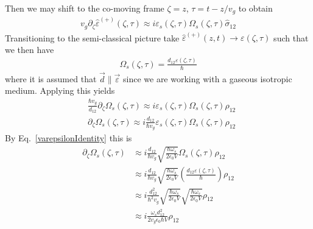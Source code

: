 \documentclass[aps,pra,showpacs,amsmath,amssymb,nofootinbib,longbibliography,superscriptaddress
]{revtex4-1}
\theoremstyle{definition}
\theoremstyle{remark}
\newcommand{\0}{\hat{0}}
\begin{document}
Then we may shift to the co-moving frame $\zeta= z$, $\tau = t - z / v_g$ to obtain
\begin{align}
    v_g \partial_\zeta \hat{\varepsilon}^{(+)}(\zeta, \tau)
    \approx
    i \varepsilon_s(\zeta, \tau) \Omega_{s}(\zeta, \tau) \hat{\sigma}_{12}
\end{align}
Transitioning to the semi-classical picture take $\hat{\varepsilon}^{(+)}(z,t) \rightarrow \varepsilon(\zeta, \tau)$ such that we then have
\begin{align}
    \Omega_s(\zeta, \tau) = \frac{d_{12} \varepsilon(\zeta, \tau)}{\hbar}
\end{align}
where it is assumed that $\vec{d} \parallel \vec{\varepsilon}$ since we are working with a gaseous isotropic medium. Applying this yields 
\begin{align}
    &\frac{\hbar v_g}{d_{12}} \partial_\zeta \Omega_s(\zeta, \tau)
    \approx
    i \varepsilon_s(\zeta, \tau) \Omega_{s}(\zeta, \tau) \rho_{12} \nonumber \\
    &\partial_\zeta \Omega_s(\zeta, \tau)
    \approx
    i \frac{d_{12}}{\hbar v_g}  \varepsilon_s(\zeta, \tau) \Omega_{s}(\zeta, \tau) \rho_{12} 
\end{align}
By Eq.~\eqref{varepsilonIdentity} this is
\begin{align}
    \partial_\zeta \Omega_s(\zeta, \tau)
    &\approx
    i \frac{d_{12}}{\hbar v_g}  \sqrt{\frac{\hbar \omega_s}{2 \epsilon_0 V}} \Omega_{s}(\zeta, \tau) \rho_{12} \nonumber \\
    &\approx
    i \frac{d_{12}}{\hbar v_g}  \sqrt{\frac{\hbar \omega_s}{2 \epsilon_0 V}} \left(\frac{d_{12} \varepsilon(\zeta, \tau)}{\hbar}\right) \rho_{12} \nonumber\\
    &\approx
    i \frac{d_{12}^2}{\hbar^2 v_g}  \sqrt{\frac{\hbar \omega_s}{2 \epsilon_0 V}} \sqrt{\frac{\hbar \omega_s}{2 \epsilon_0 V}} \rho_{12} \nonumber\\
    &\approx
    i \frac{\omega_s d_{12}^2}{2 v_g \epsilon_0 \hbar V } \rho_{12}
\end{align}
\end{document}
